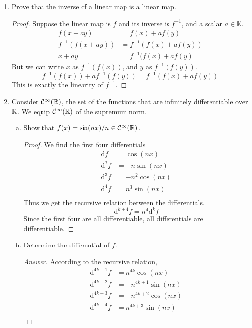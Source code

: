 \begin{enumerate}
\begin{proof}
\begin{align*}
		g(f(x+ay))&=g(f(x)+a f(y))=g(f(x))+a g(f(y))
	\end{align*}
	This is exactly the linearity of the composition $g(f)$.
	\end{proof}
    \item Prove that the inverse of a linear map is a linear map.
	\begin{proof}
	Suppose the linear map is $f$ and its inverse is $f^{-1}$, and a scalar \(a\in\mathbb{K}\).
	\begin{align*}
	f(x+ay)&=f(x)+a f(y)\\
	f^{-1}(f(x+ay))&=f^{-1}(f(x)+a f(y))\\
	x+ay&=f^{-1}(f(x)+a f(y)
	\end{align*}
	But we can write $x$ as \(f^{-1}(f(x))\), and $y$ as \(f^{-1}(f(y))\).
	\[f^{-1}(f(x))+af^{-1}(f(y))=f^{-1}(f(x)+a f(y)) \]
	This is exactly the linearity of $f^{-1}$.
	\end{proof}
    \item Consider \(\mathcal{C}^\infty(\mathbb{R})\), the set of the functions that are infinitely differentiable over $\mathbb{R}$. We equip \(\mathcal{C}^\infty(\mathbb{R})\) of the supremum norm.
    \begin{enumerate}[(a)]
    	\item Show that \(f(x) = \sin(nx)/n \in \mathcal{C}^\infty(\mathbb{R})\).
		\begin{proof}
		We find the first four differentials
		\begin{align*}
		\mathrm{d}f&=\cos(nx)\\
		\mathrm{d}^2f&=-n\sin(nx)\\
		\mathrm{d}^3f&=-n^2\cos(nx)\\
		\mathrm{d}^4f&=n^3\sin(nx)\\
		\end{align*}
		Thus we get the recursive relation between the differentials.
		\[\mathrm{d}^{k+4}f=n^4\mathrm{d}^{k}f \]
		Since the first four are all differentiable, all differentials are differentiable.
		\end{proof}
        \item Determine the differential of $f$.
		\begin{proof}[Answer]
		According to the recursive relation,
		\begin{align*}
		\mathrm{d}^{4k+1}f&=n^{4k}\cos(nx) \\
		\mathrm{d}^{4k+2}f&=-n^{4k+1}\sin(nx)\\
		\mathrm{d}^{4k+3}f&=-n^{4k+2}\cos(nx)\\
		\mathrm{d}^{4k+4}f&=n^{4k+3}\sin(nx)\\

\end{align*}
\end{proof}
\end{enumerate}
\end{enumerate}
